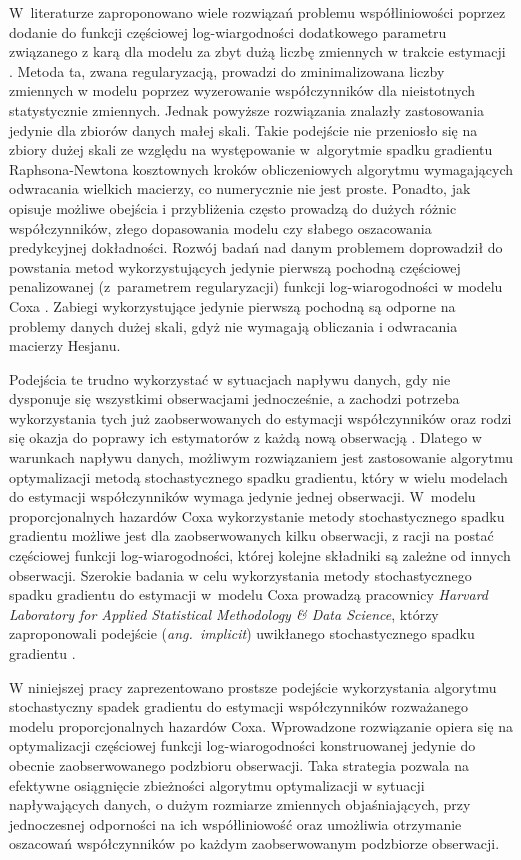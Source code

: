 W~literaturze zaproponowano wiele rozwiązań problemu współliniowości poprzez dodanie do funkcji częściowej log-wiargodności dodatkowego parametru związanego z karą dla modelu za zbyt dużą liczbę zmiennych w trakcie estymacji \citep{parkm, sohn, goemann}. Metoda ta, zwana regularyzacją, prowadzi do zminimalizowana liczby zmiennych w modelu poprzez wyzerowanie współczynników dla nieistotnych statystycznie zmiennych. Jednak powyższe rozwiązania znalazły zastosowania jedynie dla zbiorów danych małej skali. Takie podejście nie przeniosło się na zbiory dużej skali ze względu na występowanie w~algorytmie spadku gradientu Raphsona-Newtona kosztownych kroków obliczeniowych algorytmu wymagających odwracania wielkich macierzy, co numerycznie nie jest proste. Ponadto, jak opisuje \cite{mital} możliwe obejścia i przybliżenia często prowadzą do dużych różnic współczynników, złego dopasowania modelu czy słabego oszacowania predykcyjnej dokładności. Rozwój badań nad danym problemem \citep{KIMKIM} doprowadził do powstania metod wykorzystujących jedynie pierwszą pochodną częściowej penalizowanej (z~parametrem regularyzacji) funkcji log-wiarogodności w modelu Coxa \citep{sohn, KIM, mital}. Zabiegi wykorzystujące jedynie pierwszą pochodną są odporne na problemy danych dużej skali, gdyż nie wymagają obliczania i odwracania macierzy Hesjanu. 

Podejścia te trudno wykorzystać w sytuacjach napływu danych, gdy nie dysponuje się wszystkimi obserwacjami jednocześnie, a zachodzi potrzeba wykorzystania tych już zaobserwowanych do estymacji współczynników oraz rodzi się okazja do poprawy ich estymatorów z każdą nową obserwacją \citep{bottDOD}. Dlatego w warunkach napływu danych, możliwym rozwiązaniem jest zastosowanie algorytmu optymalizacji metodą stochastycznego spadku gradientu, który w wielu modelach do estymacji współczynników wymaga jedynie jednej obserwacji. W~modelu proporcjonalnych hazardów Coxa wykorzystanie metody stochastycznego spadku gradientu możliwe jest dla zaobserwowanych kilku obserwacji, z racji na postać częściowej funkcji log-wiarogodności, której kolejne składniki są zależne od innych obserwacji. Szerokie badania w celu wykorzystania metody stochastycznego spadku gradientu do estymacji w~modelu Coxa prowadzą pracownicy \textit{Harvard Laboratory for Applied Statistical Methodology \& Data Science}, którzy zaproponowali podejście (\textit{ang.~implicit}) uwikłanego stochastycznego spadku gradientu \citep{toulis}.  

 W niniejszej pracy zaprezentowano prostsze podejście wykorzystania algorytmu stochastyczny spadek gradientu do estymacji współczynników rozważanego modelu proporcjonalnych hazardów Coxa. Wprowadzone rozwiązanie opiera się na optymalizacji częściowej funkcji log-wiarogodności konstruowanej jedynie do obecnie zaobserwowanego podzbioru obserwacji. Taka strategia pozwala na efektywne osiągnięcie zbieżności algorytmu optymalizacji w sytuacji napływających danych, o dużym rozmiarze zmiennych objaśniających, przy jednoczesnej odporności na ich współliniowość oraz umożliwia otrzymanie oszacowań współczynników po każdym zaobserwowanym podzbiorze obserwacji.

